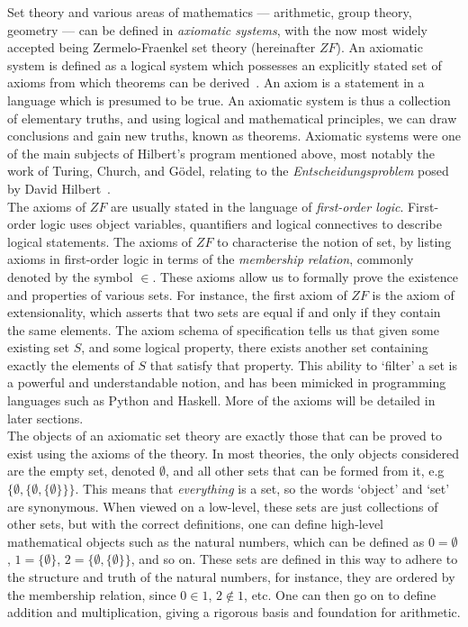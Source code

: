 \documentclass[11pt]{report}
\theoremstyle{definition}
\theoremstyle{theorem}
\theoremstyle{lemma}
\begin{document}
Set theory and various areas of mathematics --- arithmetic, group theory, geometry --- can be defined in \emph{axiomatic systems}, with the now most widely accepted being Zermelo-Fraenkel set theory (hereinafter $\mathit{ZF}$).
An axiomatic system is defined as a logical system which possesses an explicitly stated set of axioms from which theorems can be derived~\cite{wolfaxiom}.
An axiom is a statement in a language which is presumed to be true.
An axiomatic system is thus a collection of elementary truths, and using logical and mathematical principles, we can draw conclusions and gain new truths, known as theorems.
Axiomatic systems were one of the main subjects of Hilbert's program mentioned above, most notably the work of Turing, Church, and G\"odel, relating to the \emph{Entscheidungsproblem} posed by David Hilbert~\cite{stancomput}.\\


The axioms of $\mathit{ZF}$ are usually stated in the language of \emph{first-order logic}.
First-order logic uses object variables, quantifiers and logical connectives to describe logical statements.
The axioms of $\mathit{ZF}$ to characterise the notion of set, by listing axioms in first-order logic in terms of the \emph{membership relation}, commonly denoted by the symbol $\in$.
These axioms allow us to formally prove the existence and properties of various sets.
For instance, the first axiom of $\mathit{ZF}$ is the axiom of extensionality, which asserts that two sets are equal if and only if they contain the same elements.
The axiom schema of specification tells us that given some existing set $S$, and some logical property, there exists another set containing exactly the elements of $S$ that satisfy that property.
This ability to `filter' a set is a powerful and understandable notion, and has been mimicked in programming languages such as Python and Haskell. 
More of the axioms will be detailed in later sections.\\

The objects of an axiomatic set theory are exactly those that can be proved to exist using the axioms of the theory. 
In most theories, the only objects considered are the empty set, denoted $\emptyset$, and all other sets that can be formed from it, e.g $\{\emptyset, \{\emptyset, \{\emptyset\}\}\}$. 
This means that \emph{everything} is a set, so the words `object' and `set' are synonymous.
When viewed on a low-level, these sets are just collections of other sets, but with the correct definitions, one can define high-level mathematical objects such as the natural numbers, which can be defined as $0 = \emptyset$, $1=\{\emptyset\}$, $2=\{\emptyset, \{\emptyset\}\}$, and so on.
These sets are defined in this way to adhere to the structure and truth of the natural numbers, for instance, they are ordered by the membership relation, since $0\in 1$, $2\notin 1$, etc.
One can then go on to define addition and multiplication, giving a rigorous basis and foundation for arithmetic.
\end{document}
